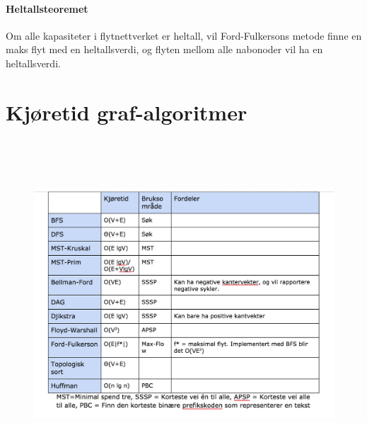 \documentclass[12pt]{report}
\begin{document}

\par


\vspace{\baselineskip}

\vspace{\baselineskip}
\paragraph*{Heltallsteoremet}
\setlength{\parskip}{10.56pt}
Om alle kapasiteter i flytnettverket er heltall, vil Ford-Fulkersons metode finne en maks flyt med en heltallsverdi, og flyten mellom alle nabonoder vil ha en heltallsverdi.\par


\vspace{\baselineskip}

\vspace{\baselineskip}

\vspace{\baselineskip}

\vspace{\baselineskip}

\vspace{\baselineskip}\section*{Kjøretid graf-algoritmer}



\begin{figure}[H]
	\begin{Center}
		\includegraphics[width=6.27in,height=4.79in]{./media/image151.png}
	\end{Center}
\end{figure}
\end{document}
